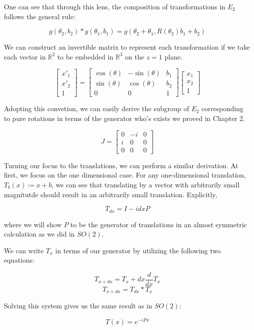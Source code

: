 \documentclass[10pt]{ucthesis}
\newcommand{\R}{\mathbb{R}}
\begin{document}
One can see that through this lens, the composition of transformations in $E_2$ follows the general rule:

$$g(\theta_2,b_2)*g(\theta_1,b_1) = g(\theta_2+\theta_1,R(\theta_2)b_1 + b_2)$$

We can construct an invertible matrix to represent each transformation if we take each vector in $\R^2$ to be embedded in $\R^3$ on the $z=1$ plane.

$$\begin{bmatrix}x'_1\\x'_2 \\ 1\end{bmatrix} = \begin{bmatrix}
			\cos(\theta) & -\sin(\theta) & b_1\\
			\sin(\theta) & \cos(\theta) & b_2 \\
			0&0&1
		\end{bmatrix} \begin{bmatrix}x_1\\x_2\\1\end{bmatrix} $$

Adopting this convetion, we can easily derive the subgroup of $E_2$ corresponding to pure rotations in terms of the generator who's exists we proved in Chapter 2. 

$$J=\begin{bmatrix}
			0 & -i & 0\\
			i & 0 & 0 \\
			0 & 0 & 0
		\end{bmatrix}$$

Turning our focus to the translations, we can perform a similar derivation. At first, we focus on the one dimensional case. For any one-dimensional translation, $T_b(x)\coloneq x + b$,  we can see that translating by a vector with arbitrarily small magnitutde should result in an arbitrarily small translation. Explicitly,

$$T_{dx} = I -idxP$$

where we will show $P$ to be the generator of translations in an almost symmetric calculation as we did in $SO(2)$.

We can write $T_x$ in terms of our generator by utilizing the following two equations:

$$T_{x+dx} = T_x + dx \frac{d}{dx}T_x$$
$$T_{x+dx} = T_{dx}*T_x$$

Solving this system gives us the same result as in $SO(2)$:

$$T(x) = e^{-iPx}$$
\end{document}
